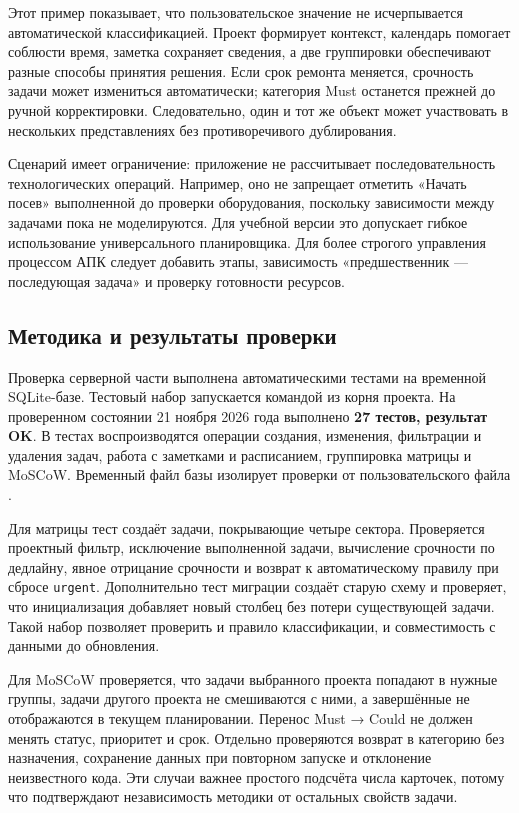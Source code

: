 \documentclass[14pt,a4paper]{extarticle}
\begin{document}
Этот пример показывает, что пользовательское значение не исчерпывается автоматической классификацией. Проект формирует контекст, календарь помогает соблюсти время, заметка сохраняет сведения, а две группировки обеспечивают разные способы принятия решения. Если срок ремонта меняется, срочность задачи может измениться автоматически; категория Must останется прежней до ручной корректировки. Следовательно, один и тот же объект может участвовать в нескольких представлениях без противоречивого дублирования.

Сценарий имеет ограничение: приложение не рассчитывает последовательность технологических операций. Например, оно не запрещает отметить «Начать посев» выполненной до проверки оборудования, поскольку зависимости между задачами пока не моделируются. Для учебной версии это допускает гибкое использование универсального планировщика. Для более строгого управления процессом АПК следует добавить этапы, зависимость «предшественник --- последующая задача» и проверку готовности ресурсов.

\subsection{Методика и результаты проверки}

Проверка серверной части выполнена автоматическими тестами на временной SQLite-базе. Тестовый набор запускается командой  из корня проекта. На проверенном состоянии 21 ноября 2026 года выполнено \textbf{27 тестов, результат OK}. В тестах воспроизводятся операции создания, изменения, фильтрации и удаления задач, работа с заметками и расписанием, группировка матрицы и MoSCoW. Временный файл базы изолирует проверки от пользовательского файла .

Для матрицы тест создаёт задачи, покрывающие четыре сектора. Проверяется проектный фильтр, исключение выполненной задачи, вычисление срочности по дедлайну, явное отрицание срочности и возврат к автоматическому правилу при сбросе \texttt{urgent}. Дополнительно тест миграции создаёт старую схему и проверяет, что инициализация добавляет новый столбец без потери существующей задачи. Такой набор позволяет проверить и правило классификации, и совместимость с данными до обновления.

Для MoSCoW проверяется, что задачи выбранного проекта попадают в нужные группы, задачи другого проекта не смешиваются с ними, а завершённые не отображаются в текущем планировании. Перенос Must → Could не должен менять статус, приоритет и срок. Отдельно проверяются возврат в категорию без назначения, сохранение данных при повторном запуске и отклонение неизвестного кода. Эти случаи важнее простого подсчёта числа карточек, потому что подтверждают независимость методики от остальных свойств задачи.
\end{document}
